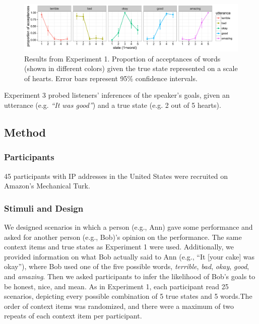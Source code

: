 \documentclass[10pt,letterpaper]{article}
\begin{document}
\begin{figure}[t]
\begin{center} 
  \includegraphics[width=.9\textwidth]{figures/exp1.pdf}
  \caption{\label{fig:exp1} Results from Experiment 1. Proportion of acceptances of words (shown in different colors) given the true state represented on a scale of hearts. Error bars represent 95\% confidence intervals.}
  \end{center} 
\end{figure}

Experiment 3 probed listeners' inferences of the speaker's goals, given an utterance (e.g. \emph{``It was good''}) and a true state (e.g. 2 out of 5 hearts). 

\subsection{Method} 

\subsubsection{Participants}

45 participants with IP addresses in the United States were recruited on Amazon's Mechanical Turk. 

\subsubsection{Stimuli and Design}

We designed scenarios in which a person (e.g., Ann) gave some performance and asked for another person (e.g., Bob)'s opinion on the performance. The same context items and true states as Experiment 1 were used. Additionally, we provided information on what Bob actually said to Ann (e.g., ``It [your cake] was okay''), where Bob used one of the five possible words,  \emph{terrible}, \emph{bad}, \emph{okay}, \emph{good}, and \emph{amazing}. Then we asked participants to infer the likelihood of Bob's goals to be honest, nice, and mean. As in Experiment 1, each participant read 25 scenarios, depicting every possible combination of 5 true states and 5 words.The order of context items was randomized, and there were a maximum of two repeats of each context item per participant.
\end{document}
